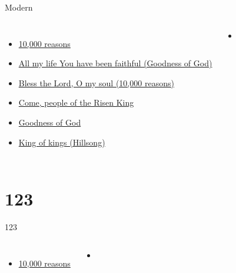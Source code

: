 \documentclass{beamer}
\begin{document}
\begin{frame}{Modern}
\begin{columns}
        \begin{itemize}
    \item \hyperlink{10,000 reasons['Bless the Lord, O my soul']}{10,000 reasons } \phantom{ 1 1 1 1 1 1 1 1 1 1}
    \item \hyperlink{Goodness of God['All my life You have been faithful']}{All my life You have been faithful (Goodness of God)} \phantom{}
    \item \hyperlink{10,000 reasons['Bless the Lord, O my soul']}{Bless the Lord, O my soul (10,000 reasons)} \phantom{}
    \item \hyperlink{Come, people of the Risen King[]}{Come, people of the Risen King } \phantom{ 1 1}
    \item \hyperlink{Goodness of God['All my life You have been faithful']}{Goodness of God } \phantom{ 1 1 1 1 1 1 1 1 1 1}
    \item \hyperlink{King of kings[](Hillsong)}{King of kings (Hillsong)} \phantom{ 1 1 1 1 1 1}
\end{itemize}
        \begin{itemize}
            \item[] \phantom{1}\end{itemize}


\end{columns}

\end{frame}

\section{123}

\begin{frame}{123}
\begin{columns}
        \begin{itemize}
    \item \hyperlink{10,000 reasons['Bless the Lord, O my soul']}{10,000 reasons } \phantom{ 1 1 1 1 1 1 1 1 1 1}
\end{itemize}
        \begin{itemize}
            \item[] \phantom{1}\end{itemize}


\end{columns}

\end{frame}
\end{document}
